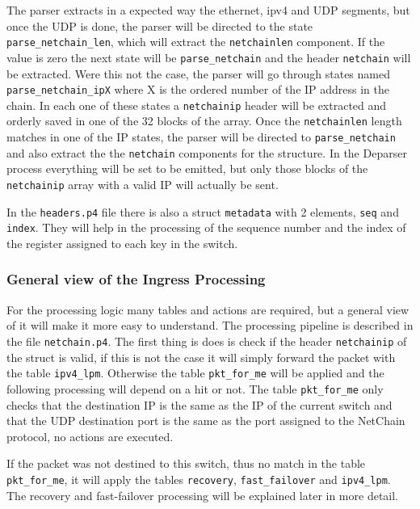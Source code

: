 \documentclass[11pt,oneside,a4paper]{article}
\begin{document}
The parser extracts in a expected way the ethernet, ipv4 and UDP segments, but once the UDP is done, the parser will be directed to the state {\color{red}\texttt{parse\_netchain\_len}}, which will extract the {\color{red}\texttt{netchainlen}} component. If the value is zero the next state will be {\color{red}\texttt{parse\_netchain}} and the header {\color{red}\texttt{netchain}} will be extracted. Were this not the case, the parser will go through states named {\color{red}\texttt{parse\_netchain\_ipX}} where X is the ordered number of the IP address in the chain. In each one of these states a {\color{red}\texttt{netchainip}} header will be extracted and orderly saved in one of the 32 blocks of the array. Once the {\color{red}\texttt{netchainlen}} length matches in one of the IP states, the parser will be directed to {\color{red}\texttt{parse\_netchain}} and also extract the the {\color{red}\texttt{netchain}} components for the structure. In the Deparser process everything will be set to be emitted, but only those blocks of the {\color{red}\texttt{netchainip}} array with a valid IP will actually be sent.

In the {\color{red}\texttt{headers.p4}} file there is also a  struct {\color{red}\texttt{metadata}} with 2 elements, {\color{red}\texttt{seq}} and {\color{red}\texttt{index}}. They will help in the processing of the sequence number and the index of the register assigned to each key in the switch. 

\subsubsection{General view of the Ingress Processing}

For the processing logic many tables and actions are required, but a general view of it will make it more easy to understand. The processing pipeline is described in the file {\color{red}\texttt{netchain.p4}}. The first thing is does is check if the header {\color{red}\texttt{netchainip}} of the struct is valid, if this is not the case it will simply forward the packet with the table {\color{red}\texttt{ipv4\_lpm}}. Otherwise the table {\color{red}\texttt{pkt\_for\_me}} will be applied and the following processing will depend on a hit or not. The table {\color{red}\texttt{pkt\_for\_me}} only checks that the destination IP is the same as the IP of the current switch and that the UDP destination port is the same as the port assigned to the NetChain protocol, no actions are executed. 

If the packet was not destined to this switch, thus no match in the table {\color{red}\texttt{pkt\_for\_me}}, it will apply the tables {\color{red}\texttt{recovery}}, {\color{red}\texttt{fast\_failover}} and {\color{red}\texttt{ipv4\_lpm}}. The recovery and fast-failover processing will be explained later in more detail. 
\end{document}

